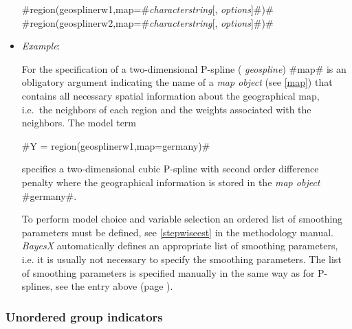 \begin{itemize}
#region(geosplinerw1,map=#{\em characterstring}[, {\em options}]#)# \\
#region(geosplinerw2,map=#{\em characterstring}[, {\em options}]#)#
\item[] {\em Example}:

For the specification of a two-dimensional P-spline ({\em
geospline}) #map# is an obligatory argument indicating the name of
a {\em map object} (see \autoref{map}) that contains all necessary
spatial information about the geographical map, i.e.~the neighbors
of each region and the weights associated with the neighbors. The
model term

#Y = region(geosplinerw1,map=germany)#

specifies a two-dimensional cubic P-spline with second order difference
penalty where the geographical information is stored in the
{\em map object} #germany#.

To perform model choice and variable selection an ordered list of smoothing parameters must be defined, see
\autoref{stepwiseest} in the methodology manual. {\em BayesX} automatically defines an appropriate list of smoothing
parameters, i.e. it is usually not necessary to  specify the smoothing parameters. The list of smoothing parameters is
specified manually in the same way as for P-splines, see the entry above (page \pageref{psplines_stepwise}).
\end{itemize}

\subsubsection*{Unordered group indicators}


